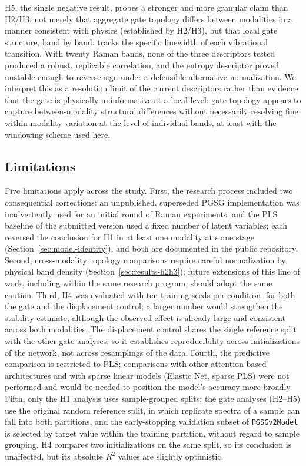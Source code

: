 \documentclass[preprint,12pt]{elsarticle}
\begin{document}
H5, the single negative result, probes a stronger and more granular claim than H2/H3: not merely that aggregate gate topology differs between modalities in a manner consistent with physics (established by H2/H3), but that local gate structure, band by band, tracks the specific linewidth of each vibrational transition. With twenty Raman bands, none of the three descriptors tested produced a robust, replicable correlation, and the entropy descriptor proved unstable enough to reverse sign under a defensible alternative normalization. We interpret this as a resolution limit of the current descriptors rather than evidence that the gate is physically uninformative at a local level: gate topology appears to capture between-modality structural differences without necessarily resolving fine within-modality variation at the level of individual bands, at least with the windowing scheme used here.

\subsection{Limitations}

Five limitations apply across the study. First, the research process included two consequential corrections: an unpublished, superseded PGSG implementation was inadvertently used for an initial round of Raman experiments, and the PLS baseline of the submitted version used a fixed number of latent variables; each reversed the conclusion for H1 in at least one modality at some stage (Section~\ref{sec:model-identity}), and both are documented in the public repository. Second, cross-modality topology comparisons require careful normalization by physical band density (Section~\ref{sec:results-h2h3}); future extensions of this line of work, including within the same research program, should adopt the same caution. Third, H4 was evaluated with ten training seeds per condition, for both the gate and the displacement control; a larger number would strengthen the stability estimate, although the observed effect is already large and consistent across both modalities. The displacement control shares the single reference split with the other gate analyses, so it establishes reproducibility across initializations of the network, not across resamplings of the data. Fourth, the predictive comparison is restricted to PLS; comparisons with other attention-based architectures and with sparse linear models (Elastic Net, sparse PLS) were not performed and would be needed to position the model's accuracy more broadly. Fifth, only the H1 analysis uses sample-grouped splits: the gate analyses (H2--H5) use the original random reference split, in which replicate spectra of a sample can fall into both partitions, and the early-stopping validation subset of \texttt{PGSGv2Model} is selected by target value within the training partition, without regard to sample grouping. H4 compares two initializations on the same split, so its conclusion is unaffected, but its absolute $R^{2}$ values are slightly optimistic.
\end{document}
